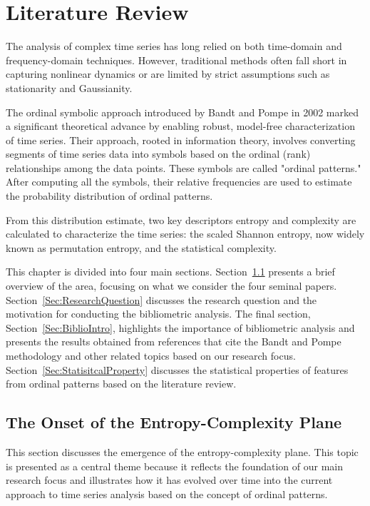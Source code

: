 \chapter{Literature Review}\label{C:lit}

The analysis of complex time series has long relied on both time-domain and frequency-domain techniques. 
However, traditional methods often fall short in capturing nonlinear dynamics or are limited by strict assumptions such as stationarity and Gaussianity. 

The ordinal symbolic approach introduced by Bandt and Pompe in 2002 marked a significant theoretical advance by enabling robust, model-free characterization of time series. 
Their approach, rooted in information theory, involves converting segments of time series data into symbols based on the ordinal (rank) relationships among the data points.
These symbols are called "ordinal patterns." After computing all the symbols, their relative frequencies are used to estimate the probability distribution of ordinal patterns.

From this distribution estimate, two key descriptors entropy and complexity are calculated to characterize the time series: the scaled Shannon entropy, now widely known as permutation entropy, and the statistical complexity.

This chapter is divided into four main sections. Section~\ref{Sec:Onset} presents a brief overview of the area, focusing on what we consider the four seminal papers. Section~\ref{Sec:ResearchQuestion} discusses the research question and the motivation for conducting the bibliometric analysis. The final section, Section~\ref{Sec:BiblioIntro}, highlights the importance of bibliometric analysis and presents the results obtained from references that cite the Bandt and Pompe methodology and other related topics based on our research focus. 
Section~\ref{Sec:StatisitcalProperty} discusses the statistical properties of features from ordinal patterns based on the literature review.   

\section{The Onset of the Entropy-Complexity Plane}\label{Sec:Onset}

This section discusses the emergence of the entropy-complexity plane. This topic is presented as a central theme because it reflects the foundation of our main research focus and illustrates how it has evolved over time into the current approach to time series analysis based on the concept of ordinal patterns. 

